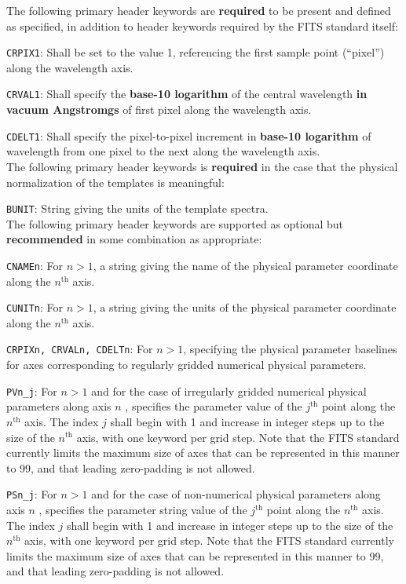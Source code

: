 \documentclass[12pt]{article}
\begin{document}
The following primary header keywords are \textbf{required} to
be present and defined as specified, in addition
to header keywords required by the FITS standard itself:

\noindent \texttt{CRPIX1}: Shall be set to the value 1, referencing the
first sample point (``pixel'') along the wavelength axis.

\noindent \texttt{CRVAL1}: Shall specify the
\textbf{base-10 logarithm} of the central wavelength
\textbf{in vacuum Angstromgs} of first pixel along the wavelength axis.

\noindent \texttt{CDELT1}: Shall specify the pixel-to-pixel
increment in \textbf{base-10 logarithm} of wavelength from
one pixel to the next along the wavelength axis. \\


The following primary header keywords is \textbf{required} in the
case that the physical normalization of the templates is meaningful:

\noindent \texttt{BUNIT}: String giving the units of the template spectra. \\

The following primary header keywords are supported as
optional but \textbf{recommended}
in some combination as appropriate:

\noindent \texttt{CNAMEn}: For $n > 1$, a string giving the
name of the physical parameter coordinate along the $n^{\mathrm{th}}$ axis.

\noindent \texttt{CUNITn}: For $n > 1$, a string giving the
units of the physical parameter coordinate along the $n^{\mathrm{th}}$ axis.

\noindent \texttt{CRPIXn, CRVALn, CDELTn}: For $n > 1$, specifying
the physical parameter baselines for axes corresponding to
regularly gridded numerical physical parameters.

\noindent \texttt{PVn\_j}: For $n > 1$ and for the case of irregularly gridded
numerical physical parameters along axis $n$ , specifies the parameter value
of the $j^{\mathrm{th}}$ point along the $n^{\mathrm{th}}$ axis.
The index $j$ shall begin with 1 and increase in integer steps up to the
size of the $n^{\mathrm{th}}$ axis, with one keyword per grid step.
Note that the FITS standard currently limits the maximum size of axes
that can be represented in this manner to 99, and that leading zero-padding
is not allowed.

\noindent \texttt{PSn\_j}: For $n > 1$ and for the case of non-numerical
physical parameters along axis $n$ , specifies the parameter string value
of the $j^{\mathrm{th}}$ point along the $n^{\mathrm{th}}$ axis.
The index $j$ shall begin with 1 and increase in integer steps up to the
size of the $n^{\mathrm{th}}$ axis, with one keyword per grid step.
Note that the FITS standard currently limits the maximum size of axes
that can be represented in this manner to 99, and that leading zero-padding
is not allowed.
\end{document}
